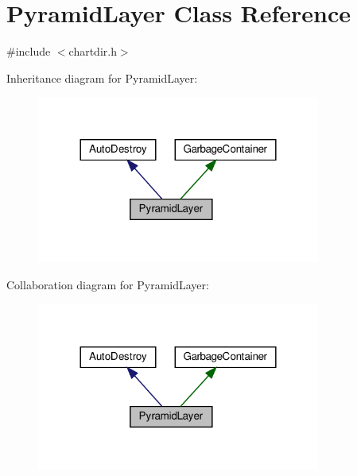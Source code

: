 \hypertarget{class_pyramid_layer}{}\section{Pyramid\+Layer Class Reference}
\label{class_pyramid_layer}


{\ttfamily \#include $<$chartdir.\+h$>$}



Inheritance diagram for Pyramid\+Layer\+:
\nopagebreak
\begin{figure}[H]
\begin{center}
\leavevmode
\includegraphics[width=264pt]{class_pyramid_layer__inherit__graph}
\end{center}
\end{figure}


Collaboration diagram for Pyramid\+Layer\+:
\nopagebreak
\begin{figure}[H]
\begin{center}
\leavevmode
\includegraphics[width=264pt]{class_pyramid_layer__coll__graph}
\end{center}
\end{figure}
